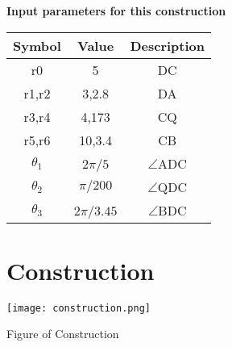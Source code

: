 \documentclass[journal,12pt,twocolumn]{IEEEtran}
\begin{document}
\begin{flushleft}
\newpage
\textbf{Input parameters for this construction}
\begin{center}
\begin{tabular}{|c|c|c|}
\hline
\textbf{Symbol}&{Value}&{Description}\\
\hline
r0&5&DC\\
\hline
r1,r2&3,2.8&DA\\
\hline
r3,r4&4,173&CQ\\
\hline
r5,r6&10,3.4&CB\\
\hline
${\theta}_1$& 2$\pi/5$&$ \angle $ADC\\ 
\hline
${\theta}_2$& $\pi/200$&$ \angle $QDC\\ 
\hline
${\theta}_3$& 2$\pi/3.45$&$ \angle $BDC\\ 
\hline 
\end{tabular}
\end{center}

\section{Construction}
\texttt{[image: construction.png]}
\begin{center}
Figure of Construction
\end{center}
\end{flushleft}
\end{document}

